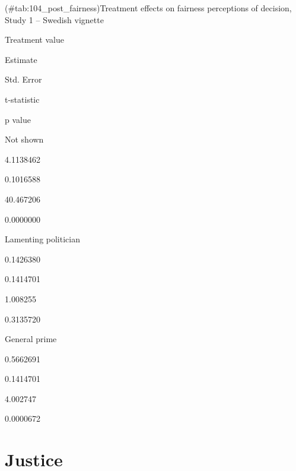 \documentclass[]{book}
\begin{document}
(\#tab:104\_post\_fairness)Treatment effects on fairness perceptions of
decision, Study 1 -- Swedish vignette

Treatment value

Estimate

Std. Error

t-statistic

p value

Not shown

4.1138462

0.1016588

40.467206

0.0000000

Lamenting politician

0.1426380

0.1414701

1.008255

0.3135720

General prime

0.5662691

0.1414701

4.002747

0.0000672

\section{Justice}\label{justice}
\end{document}
